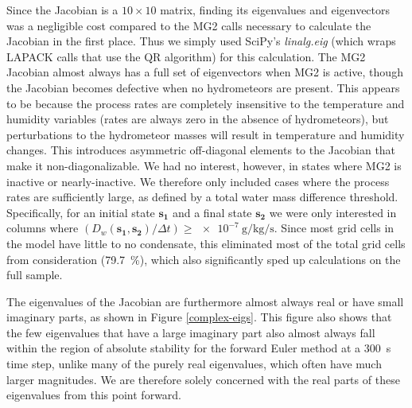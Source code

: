 \documentclass [11pt, proquest] {uwthesis}[2020/02/24]
\begin{document}
Since the Jacobian is a $\num{10} \times \num{10}$ matrix, finding its eigenvalues and eigenvectors was a negligible cost compared to the MG2 calls necessary to calculate the Jacobian in the first place. Thus we simply used SciPy's \emph{linalg.eig} (which wraps LAPACK calls that use the QR algorithm) for this calculation. The MG2 Jacobian almost always has a full set of eigenvectors when MG2 is active, though the Jacobian becomes defective when no hydrometeors are present. This appears to be because the process rates are completely insensitive to the temperature and humidity variables (rates are always zero in the absence of hydrometeors), but perturbations to the hydrometeor masses will result in temperature and humidity changes. This introduces asymmetric off-diagonal elements to the Jacobian that make it non-diagonalizable. We had no interest, however, in states where MG2 is inactive or nearly-inactive. We therefore only included cases where the process rates are sufficiently large, as defined by a total water mass difference threshold. Specifically, for an initial state $\mathbf{s_1}$ and a final state $\mathbf{s_2}$ we were only interested in columns where $(D_w(\mathbf{s_1}, \mathbf{s_2})/\Delta t) \ge \SI{e-7}{\gram\per\kilo\gram\per\second}$. Since most grid cells in the model have little to no condensate, this eliminated most of the total grid cells from consideration (\SI{79.7}{\percent}), which also significantly sped up calculations on the full sample.

The eigenvalues of the Jacobian are furthermore almost always real or have small imaginary parts, as shown in Figure \ref{complex-eigs}. This figure also shows that the few eigenvalues that have a large imaginary part also almost always fall within the region of absolute stability for the forward Euler method at a \SI{300}{\second} time step, unlike many of the purely real eigenvalues, which often have much larger magnitudes. We are therefore solely concerned with the real parts of these eigenvalues from this point forward.
\end{document}
